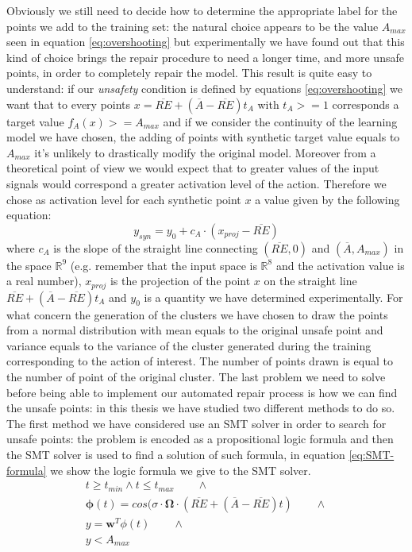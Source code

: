 Obviously we still need to decide how to determine the appropriate label for the points we add to the training set: the natural choice appears to be the value $A_{max}$ seen in equation \ref{eq:overshooting} but experimentally we have found out that this kind of choice brings the repair procedure to need a longer time, and more unsafe points, in order to completely repair the model. This result is quite easy to understand: if our \textit{unsafety} condition is defined by equations \ref{eq:overshooting} we want that to every points $x = \overline{RE} + (\overline{A} - \overline{RE})t_{A}$ with $t_{A} >= 1$ corresponds a target value $f_A(x) >= A_{max}$ and if we consider the continuity of the learning model we have chosen, the adding of points with synthetic target value equals to $A_{max}$ it's unlikely to drastically modify the original model. Moreover from a theoretical point of view we would expect that to greater values of the input signals would correspond a greater activation level of the action. Therefore we chose as activation level for each synthetic point $x$ a value given by the following equation:
\begin{equation}
    y_{syn} = y_0 + c_A \cdot (x_{proj} - \overline{RE})
    \label{eq:output_unsafe}
\end{equation}
where $c_A$ is the slope of the straight line connecting $(\overline{RE}, 0)$ and $(\overline{A}, A_{max})$ in the space $\mathbb{R}^9$ (e.g. remember that the input space is $\mathbb{R}^8$ and the activation value is a real number), $x_{proj}$ is the projection of the point $x$ on the straight line $\overline{RE} + (\overline{A} - \overline{RE})t_{A}$ and $y_0$ is a quantity we have determined experimentally.
For what concern the generation of the clusters we have chosen to draw the points from a normal distribution with mean equals to the original unsafe point and variance equals to the variance of the cluster generated during the training corresponding to the action of interest. The number of points drawn is equal to the number of point of the original cluster.
The last problem we need to solve before being able to implement our automated repair process is how we can find the unsafe points: in this thesis we have studied two different methods to do so.
The first method we have considered use an SMT solver in order to search for unsafe points: the problem is encoded as a propositional logic formula and then the SMT solver is used to find a solution of such formula, in equation \ref{eq:SMT-formula} we show the logic formula we give to the SMT solver.
\begin{equation}
\begin{aligned}
    t \geq t_{min} \wedge t \leq t_{max}\qquad \wedge \\
    \mathbf{\phi}(t) = cos(\sigma \cdot \mathbf{\Omega} \cdot (\overline{RE} + (\overline{A} - \overline{RE})t)\qquad \wedge \\
    y = \mathbf{w}^T \phi(t)\qquad \wedge \\
    y < A_{max}\qquad\quad
    \label{eq:SMT-formula}
\end{aligned}
\end{equation}
